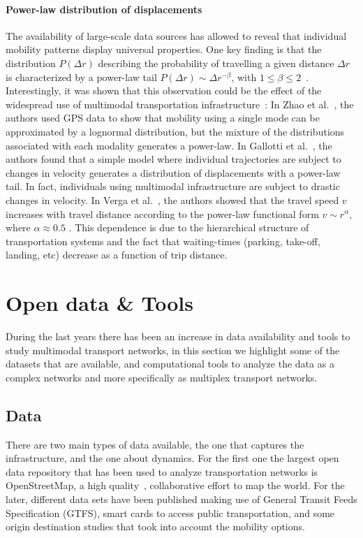 \paragraph{Power-law distribution of displacements} 
The availability of large-scale data sources has allowed to reveal that individual mobility patterns display universal properties. One key finding is that the distribution $P(\Delta r)$ describing the probability of travelling a given distance $\Delta r$ is characterized by a power-law tail $P(\Delta r)\sim \Delta r ^{-\beta}$, with $1 \leq \beta \leq 2$~\cite{barbosa2018human}. Interestingly, it was shown that this observation could be the effect of the widespread use of multimodal transportation infrastructure~\cite{gallotti2016stochastic,zhao2015explaining}: In Zhao et al.~\cite{zhao2015explaining}, the authors used GPS data to show that mobility using a single mode can be approximated by a lognormal distribution, but the mixture of the distributions associated with each modality generates a power-law. In Gallotti et al.~\cite{gallotti2016stochastic}, the authors found that a simple model where individual trajectories are subject to changes in velocity generates a distribution of displacements with a power-law tail. In fact, individuals using multimodal infrastructure are subject to drastic changes in velocity. In Verga et al.~\cite{varga2016further}, the authors showed that the travel speed $v$ increases with travel distance according to the power-law functional form $v \sim r ^\alpha$, where $\alpha \approx 0.5$ . This dependence is due to the hierarchical structure of transportation systems and the fact that waiting-times (parking, take-off, landing, etc) decrease as a function of trip distance.

\section{Open data \& Tools \label{sec:datatools}}

During the last years there has been an increase in data availability and tools to study multimodal transport networks, in this section we highlight some of the datasets that are available, and computational tools to analyze the data as a complex networks and more specifically as multiplex transport networks.

\subsection*{Data}
There are two main types of data available, the one that captures the infrastructure, and the one about dynamics. For the first one the largest open data repository that has been used to analyze transportation networks is OpenStreetMap, a high quality~\cite{haklay2010openstreetmap,girres2010quality,ferster2019openstreetmap,barbosa2018human}, collaborative effort to map the world. For the later, different data sets have been published making use of General Transit Feeds Specification (GTFS), smart cards to access public transportation, and some origin destination studies that took into account the mobility options. 

